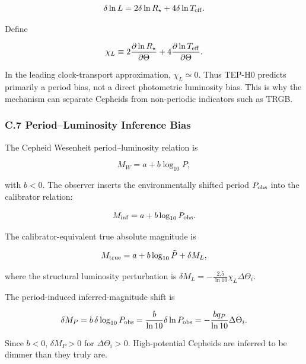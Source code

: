 \documentclass[
]{article}
\begin{document}
\begin{equation}
\delta\ln L = 2\delta\ln R_\star + 4\delta\ln T_{\rm eff} .
\end{equation}

Define

\begin{equation}
\chi_L \equiv 2\frac{\partial\ln R_\star}{\partial\Theta} + 4\frac{\partial\ln T_{\rm eff}}{\partial\Theta} .
\end{equation}

In the leading clock-transport approximation, \(\chi_L \simeq 0\). Thus
TEP-H0 predicts primarily a period bias, not a direct photometric
luminosity bias. This is why the mechanism can separate Cepheids from
non-periodic indicators such as TRGB.

\subsubsection{C.7 Period--Luminosity Inference
Bias}\label{c.7-periodluminosity-inference-bias}

The Cepheid Wesenheit period--luminosity relation is

\begin{equation}
M_W = a + b\log_{10}P ,
\end{equation}

with \(b < 0\). The observer inserts the environmentally shifted period
\(P_{\rm obs}\) into the calibrator relation:

\begin{equation}
M_{\rm inf} = a + b\log_{10}P_{\rm obs} .
\end{equation}

The calibrator-equivalent true absolute magnitude is

\begin{equation}
M_{\rm true} = a + b\log_{10}\tilde P + \delta M_L ,
\end{equation}

where the structural luminosity perturbation is
\(\delta M_L = -\frac{2.5}{\ln 10}\chi_L\Delta\Theta_i\).

The period-induced inferred-magnitude shift is

\begin{equation}
\delta M_P = b\,\delta\log_{10}P_{\rm obs} = \frac{b}{\ln 10}\delta\ln P_{\rm obs} = -\frac{b q_P}{\ln 10}\Delta\Theta_i .
\end{equation}

Since \(b < 0\), \(\delta M_P > 0\) for \(\Delta\Theta_i > 0\).
High-potential Cepheids are inferred to be dimmer than they truly are.
\end{document}
